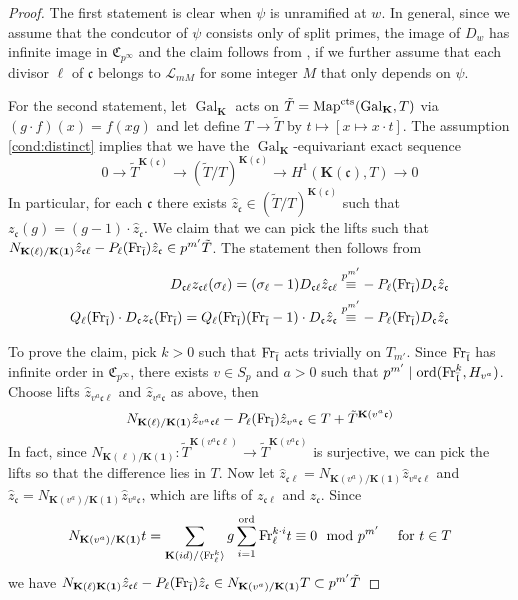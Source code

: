 \documentclass[leqno]{amsart}
\theoremstyle{definition}
\theoremstyle{remark}
\newcommand{\id}{\mathbf{1}}
\DeclareMathOperator{\Gal}{Gal}
\newcommand{\Fr}{\textnormal{Fr}} %
\newcommand{\cts}{\textnormal{cts}}
\newcommand{\fc}{\mathfrak{c}}
\newcommand{\fl}{\mathfrak{l}}
\newcommand{\K}{{\mathbf{K}}} %
\newcommand{\flw}{\bar{\fl}}
\newcommand{\rp}[1]{\mathfrak{C}_{#1}} %
\newcommand{\rs}[1]{H_{#1}} %
\newcommand{\rk}[1]{\K({#1})} %
\newcommand{\ord}{\textnormal{ord}} %
\begin{document}
\begin{proof}
The first statement is clear when 
$\psi$ is unramified at $w$.
In general, since we assume
that the condcutor of $\psi$ consists
only of split primes, the 
image of $D_w$ has infinite image in  $\rp{p^\infty}$
and the claim follows from
\cite[Cor 4.6.5]{Rubin},
if we further assume that
each divisor $\ell$ of $\fc$
belongs to  $\mathcal{L}_{mM}$ 
for some integer $M$ that only depends on  $\psi$.

For the second statement, 
let $\Gal_\K$ acts on $\tilde{T}=\text{Map}^{\cts}(\Gal_\K,T)$
via $(g\cdot f)(x)=f(xg)$ and 
let define $T\to\tilde{T}$ by
$t\mapsto [x\mapsto x\cdot t]$.
The assumption \eqref{cond:distinct} implies that
we have the $\Gal_\K$-equivariant 
exact sequence
\[
	0\to\tilde{T}^{\rk{\fc}}\to (\tilde{T}/T)^{\rk{\fc}}\to 
	H^1(\rk{\fc},T)\to 0
\]
In particular, for each $\fc$
there exists $ \hat{z}_\fc\in (\tilde{T}/T)^{\rk{\fc}}$
such that $z_\fc(g)=(g-1)\cdot \hat{z}_\fc$.
We claim that we can pick the lifts such that
$N_{\rk{\ell}/\rk{\id}}\hat{z}_{\fc\ell}-P_\ell(\Fr_{\flw})
\hat{z}_{\fc}\in p^{m'}\tilde{T}$.
The statement then follows from 
\begin{align*}
	D_{\fc\ell}z_{\fc\ell}(\sigma_\ell)=
	(\sigma_\ell-1)D_{\fc\ell}\hat{z}_{\fc\ell}
	\overset{p^{m'}}{\equiv}&
	-P_\ell(\Fr_{\flw}) D_\fc \hat{z}_\fc\\
	Q_\ell(\Fr_{\flw})\cdot
	D_\fc z_\fc(\Fr_{\flw})=
	Q_\ell(\Fr_{\flw})(\Fr_{\flw}-1)
	\cdot D_\fc \hat{z}_\fc
	\overset{p^{m'}}{\equiv}&
	-P_\ell(\Fr_{\flw}) D_\fc \hat{z}_\fc
\end{align*}

To prove the claim,
pick $k>0$ such that 
$\Fr_{\flw}$ acts trivially on $T_{m'}$.
Since $\Fr_{\flw}$ has infinite order
in $\rp{p^\infty}$,
there exists  $v\in S_p$ and  $a>0$
such that
$p^{m'}\mid \ord(\Fr_{\flw}^k, \rs{v^a})$.
Choose lifts
$\hat{z}_{v^a\fc\ell}$ and $ \hat{z}_{v^a\fc}$
as above, then
\[
	N_{\rk{\ell}/\rk{\id}}
	\hat{z}_{v^a\fc\ell}-P_\ell(\Fr_{\flw})
	\hat{z}_{v^a\fc}\in T+\tilde{T}^{\rk{v^a\fc}}
\]
In fact, since 
$N_{\rk{\ell}/\rk{\id}}\colon\tilde{T}^{\rk{v^a\fc\ell}}\to
\tilde{T}^{\rk{v^a\fc}}$ 
is surjective,
we can pick the lifts so that the difference
lies in $T$.
Now let 
$\hat{z}_{\fc\ell}=N_{\rk{v^a}/\rk{\id}}
\hat{z}_{v^a\fc\ell}$ and
$\hat{z}_{\fc}=N_{\rk{v^a}/\rk{\id}}\hat{z}_{v^a\fc}$,
which are lifts of $z_{\fc\ell}$ and $z_{\fc}$.
Since
\[
	N_{\rk{v^a}/\rk{\id}}t=
	\sum_{\rk{id}/\langle \Fr_\ell^k\rangle}g
	\sum_{i=1}^{\ord}\Fr_\ell^{k\cdot i} t\equiv 0
	\mod p^{m'}\quad
	\text{ for } t\in T
\]
we have 
$N_{\rk{\ell}\rk{\id}}\hat{z}_{\fc\ell}-P_\ell(\Fr_{\flw})
\hat{z}_{\fc}\in N_{\rk{v^a}/\rk{\id}}T\subset p^{m'}\tilde{T}$
\end{proof}
\end{document}

